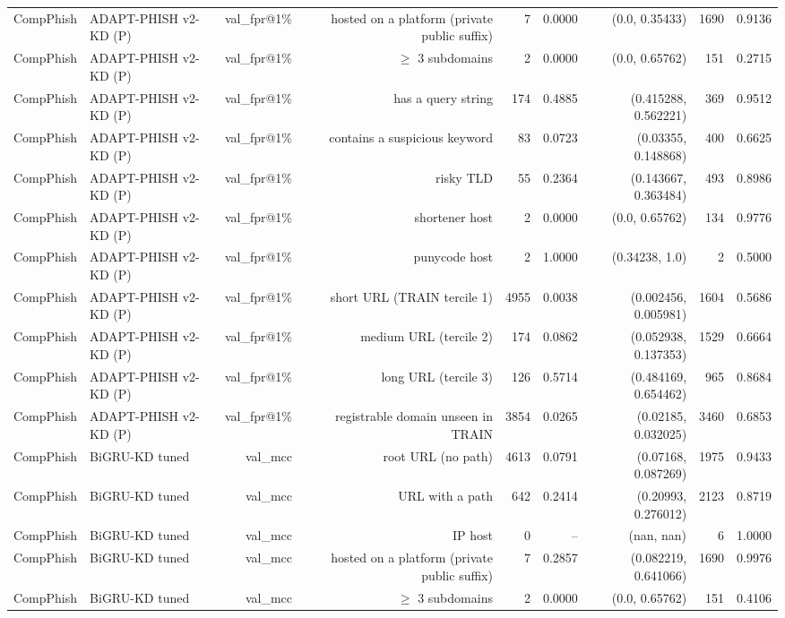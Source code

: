\begin{table}[t]
\begin{tabular}{llrrrrrrr}
CompPhish & ADAPT-PHISH v2-KD (P) & val\_fpr@1\% & hosted on a platform (private public suffix) & 7 & 0.0000 & (0.0, 0.35433) & 1690 & 0.9136 \\
CompPhish & ADAPT-PHISH v2-KD (P) & val\_fpr@1\% & $\geq$ 3 subdomains & 2 & 0.0000 & (0.0, 0.65762) & 151 & 0.2715 \\
CompPhish & ADAPT-PHISH v2-KD (P) & val\_fpr@1\% & has a query string & 174 & 0.4885 & (0.415288, 0.562221) & 369 & 0.9512 \\
CompPhish & ADAPT-PHISH v2-KD (P) & val\_fpr@1\% & contains a suspicious keyword & 83 & 0.0723 & (0.03355, 0.148868) & 400 & 0.6625 \\
CompPhish & ADAPT-PHISH v2-KD (P) & val\_fpr@1\% & risky TLD & 55 & 0.2364 & (0.143667, 0.363484) & 493 & 0.8986 \\
CompPhish & ADAPT-PHISH v2-KD (P) & val\_fpr@1\% & shortener host & 2 & 0.0000 & (0.0, 0.65762) & 134 & 0.9776 \\
CompPhish & ADAPT-PHISH v2-KD (P) & val\_fpr@1\% & punycode host & 2 & 1.0000 & (0.34238, 1.0) & 2 & 0.5000 \\
CompPhish & ADAPT-PHISH v2-KD (P) & val\_fpr@1\% & short URL (TRAIN tercile 1) & 4955 & 0.0038 & (0.002456, 0.005981) & 1604 & 0.5686 \\
CompPhish & ADAPT-PHISH v2-KD (P) & val\_fpr@1\% & medium URL (tercile 2) & 174 & 0.0862 & (0.052938, 0.137353) & 1529 & 0.6664 \\
CompPhish & ADAPT-PHISH v2-KD (P) & val\_fpr@1\% & long URL (tercile 3) & 126 & 0.5714 & (0.484169, 0.654462) & 965 & 0.8684 \\
CompPhish & ADAPT-PHISH v2-KD (P) & val\_fpr@1\% & registrable domain unseen in TRAIN & 3854 & 0.0265 & (0.02185, 0.032025) & 3460 & 0.6853 \\
CompPhish & BiGRU-KD tuned & val\_mcc & root URL (no path) & 4613 & 0.0791 & (0.07168, 0.087269) & 1975 & 0.9433 \\
CompPhish & BiGRU-KD tuned & val\_mcc & URL with a path & 642 & 0.2414 & (0.20993, 0.276012) & 2123 & 0.8719 \\
CompPhish & BiGRU-KD tuned & val\_mcc & IP host & 0 & -- & (nan, nan) & 6 & 1.0000 \\
CompPhish & BiGRU-KD tuned & val\_mcc & hosted on a platform (private public suffix) & 7 & 0.2857 & (0.082219, 0.641066) & 1690 & 0.9976 \\
CompPhish & BiGRU-KD tuned & val\_mcc & $\geq$ 3 subdomains & 2 & 0.0000 & (0.0, 0.65762) & 151 & 0.4106 \\

\end{tabular}
\end{table}
